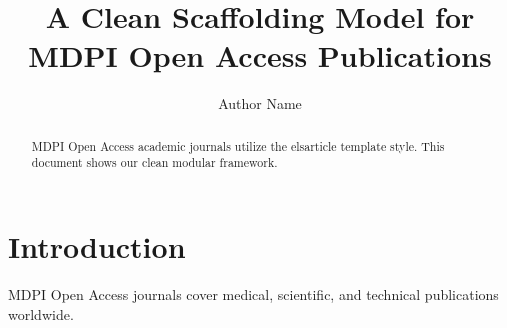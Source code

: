 \documentclass[preprint,12pt]{elsarticle}
\begin{document}
\begin{frontmatter}

\title{A Clean Scaffolding Model for MDPI Open Access Publications}
\author{Author Name}
\address{Engineering Research Center, MDPI Open Access University}

\begin{abstract}
MDPI Open Access academic journals utilize the elsarticle template style. This document shows our clean modular framework.
\end{abstract}

\end{frontmatter}

\section{Introduction}
MDPI Open Access journals cover medical, scientific, and technical publications worldwide.
\end{document}
